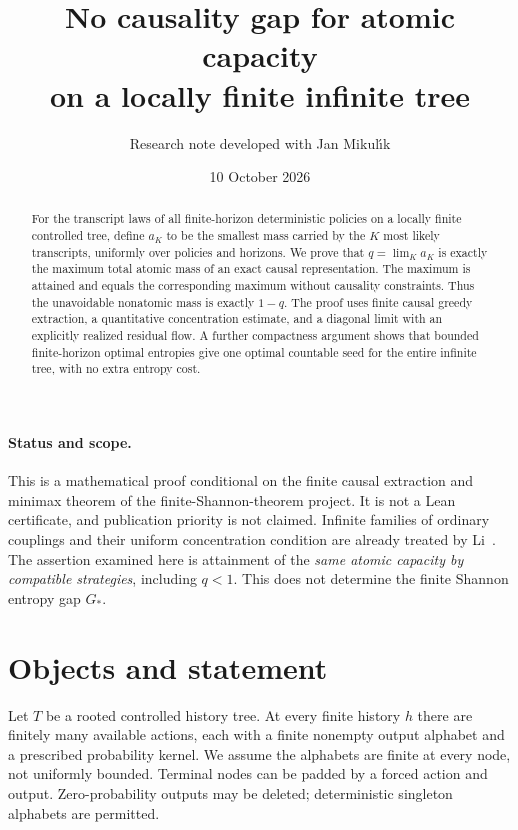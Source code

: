 \documentclass[11pt]{article}
\title{No causality gap for atomic capacity\\on a locally finite infinite tree}
\author{Research note developed with Jan Mikul\'{\i}k}
\date{10 October 2026}
\begin{document}
\maketitle
\begin{abstract}
For the transcript laws of all finite-horizon deterministic policies on a
locally finite controlled tree, define $a_K$ to be the smallest mass carried
by the $K$ most likely transcripts, uniformly over policies and horizons.
We prove that $q=\lim_K a_K$ is exactly the maximum total atomic mass of an
exact causal representation. The maximum is attained and equals the
corresponding maximum without causality constraints. Thus the unavoidable
nonatomic mass is exactly $1-q$. The proof uses finite causal greedy
extraction, a quantitative concentration estimate, and a diagonal limit
with an explicitly realized residual flow. A further compactness argument
shows that bounded finite-horizon optimal entropies give one optimal
countable seed for the entire infinite tree, with no extra entropy cost.
\end{abstract}

\paragraph{Status and scope.}
This is a mathematical proof conditional on the finite causal extraction
and minimax theorem of the finite-Shannon-theorem project. It is not a Lean
certificate, and publication priority is not claimed. Infinite families of
ordinary couplings and their uniform concentration condition are already
treated by Li~\cite{Li}. The assertion examined here is attainment of the
\emph{same atomic capacity by compatible strategies}, including $q<1$.
This does not determine the finite Shannon entropy gap $G_*$.

\section{Objects and statement}
Let $T$ be a rooted controlled history tree. At every finite history $h$
there are finitely many available actions, each with a finite nonempty
output alphabet and a prescribed probability kernel. We assume the
alphabets are finite at every node, not uniformly bounded. Terminal nodes
can be padded by a forced action and output. Zero-probability outputs may
be deleted; deterministic singleton alphabets are permitted.
\end{document}
